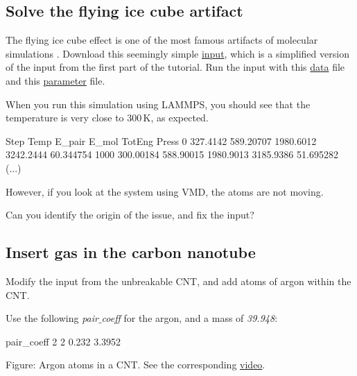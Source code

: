 \subsection{Solve the flying ice cube artifact}
\noindent The flying ice cube effect is one of the most famous artifacts of
molecular simulations \cite{wong2016good}.
Download this seemingly simple \href{https://lammpstutorials.github.io/lammpstutorials-inputs/level1/breaking-a-carbon-nanotube/exercises/flying-ice-cube/input.lammps}{input}, which is a simplified
version of the input from the first part of the tutorial.
Run the input with this \href{https://lammpstutorials.github.io/lammpstutorials-inputs/level1/breaking-a-carbon-nanotube/exercises/flying-ice-cube/cnt_molecular.data}{data} file
and this \href{https://lammpstutorials.github.io/lammpstutorials-inputs/level1/breaking-a-carbon-nanotube/exercises/flying-ice-cube/parm.lammps}{parameter} file.

\vspace{0.25cm} \noindent When you run this simulation using LAMMPS, you should see that the temperature is
very close to $300\,\text{K}$, as expected.

\begin{lcverbatim}
Step   Temp        E_pair      E_mol       TotEng      Press     
0      327.4142    589.20707   1980.6012   3242.2444   60.344754    
1000   300.00184   588.90015   1980.9013   3185.9386   51.695282
(...)
\end{lcverbatim}

\noindent However, if you look at the system using VMD, the atoms are not moving.

\vspace{0.25cm} \noindent Can you identify the origin of the issue, and fix the input?

\subsection{Insert gas in the carbon nanotube}
\noindent Modify the input from the unbreakable CNT, and add atoms of argon
within the CNT. 

\vspace{0.25cm} \noindent Use the following \textit{pair$\_$coeff} for the argon,
and a mass of \textit{39.948}:

\begin{lcverbatim}
pair_coeff 2 2 0.232 3.3952 
\end{lcverbatim}

Figure: Argon atoms in a CNT.  See the corresponding \href{https://www.youtube.com/watch?v=J4z_fZK7ekA}{video}.

